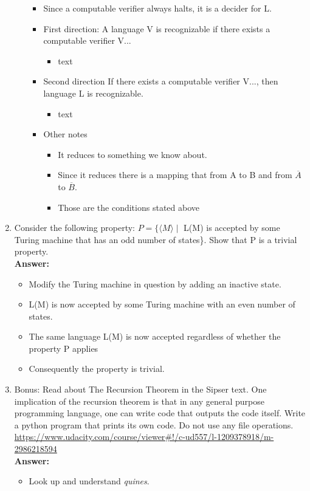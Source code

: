 \documentclass[12pt]{article}
\begin{document}
\begin{enumerate}
\begin{enumerate}
\begin{itemize}
	\item Since a computable verifier always halts, it is a decider for L.
	\item First direction: A language V is recognizable if there exists a computable verifier V...
	\begin{itemize}
	\item text
	\end{itemize}
	\item Second direction If there exists a computable verifier V..., then language L is recognizable.
	\begin{itemize}
	\item text
	\end{itemize}
	\item Other notes
	\begin{itemize}
		\item It reduces to something we know about.
		\item Since it reduces there is a mapping that from A to B and from $\overline{A}$ to $\overline{B}$.
		\item Those are the conditions stated above
	\end{itemize}
	\end{itemize}
\end{enumerate}
\item Consider the following property: $P = \{\langle M \rangle \mid$ L(M) is accepted by some Turing machine that has an odd number of states\}. Show that P is a trivial property.
		\\[.2in]\textbf{Answer:}
	\begin{itemize}
	\item Modify the Turing machine in question by adding an inactive state.  
	\item L(M) is now accepted by some Turing machine with an even number of states. 
	\item The same language L(M) is now accepted regardless of whether the property P applies
	\item Consequently the property is trivial.
	\end{itemize}
\item Bonus: Read about The Recursion Theorem in the Sipser text. One implication of the recursion theorem is that in any general purpose programming language, one can write code that outputs the code itself. Write a python program that prints its own code. Do not use any file operations.
\\[0.2in] \url{https://www.udacity.com/course/viewer#!/c-ud557/l-1209378918/m-2986218594}
\\[.2in]\textbf{Answer:}
	\begin{itemize}
	\item Look up and understand \textit{quines}.
	\end{itemize}

\end{enumerate}
\end{document}
